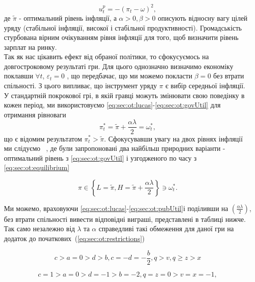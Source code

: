 \begin{equation}
\label{eq:sec:ot:pubUtil}
u^p_t=-(\pi_t - \omega)^2,
\end{equation}
де $\tilde{\pi}$ - оптимальний рівень інфляції, а $\alpha > 0, \beta > 0$ описують відносну вагу цілей уряду (стабільної інфляції, високої і стабільної продуктивності). Громадськість стурбована вірним очікуванням рівня інфляції для того, щоб визначити рівень зарплат на ринку.
\\

Так як нас цікавить ефект від обраної політики, то сфокусуємось на довгостроковому результаті гри. Для цього однозначно визначимо економіку поклавши $\forall t$,      $\varepsilon_t=0$ , що передбачає, що ми можемо покласти $\beta=0$ без втрати спільності. З цього випливає, що інструмент уряду $\pi$  є вибір середньої інфляції.
\\

У стандартній покрокової грі, в якій гравці можуть змінювати свою поведінку в кожен період, ми використовуємо \eqref{eq:sec:ot:lucas}-\eqref{eq:sec:ot:govUtil} для отримання рівноваги
\begin{equation}
\label{eq:sec:ot:equilibrium}
\pi^*_t= \tilde{\pi} + \frac{\alpha\lambda}{2}= \omega^*_t,
\end{equation}
що є відомим результатом  $\pi^*_t > \tilde{\pi}$. Сфокусувавши увагу на двох рівнях інфляції ми слідуємо ~\cite{ChoiAndMacui96InflationFinancialMarkets}, де були запропоновані два найбільш природних варіанти - оптимальний рівень з \eqref{eq:sec:ot:govUtil} і узгодженого по часу з \eqref{eq:sec:ot:equilibrium}

\begin{equation}
\label{eq:sec:ot:optimal}
\pi \in \left\{L=\tilde{\pi}, H=\tilde{\pi}+\frac{\alpha\lambda}{2} \right\} \ni \omega^*_t.
\end{equation}

Ми можемо, враховуючи \eqref{eq:sec:ot:lucas}-\eqref{eq:sec:ot:pubUtil}і поділивши на $\left(\frac{\alpha\lambda}{2}\right)$,  без втрати спільності вивести відповідні виграші, представлені в таблиці нижче. Так само незалежно від $\lambda$ та  $\alpha$ справедливі такі обмеження для даної гри на додаток до початкових~(\ref{eq:sec:ot:restrictions})

\begin{equation}
	\label{eq:sec:ot:constraint}
	c>a=0 > d > b,c=-d=-\frac{b}{2}, q>v,q\geqslant z>x
\end{equation}

\begin{equation}
\label{eq:sec:ot:exampleConstraint}
c=1 > a=0 > d=-1 > b=-2, q=z=0 > v=x=-1,
\end{equation}


